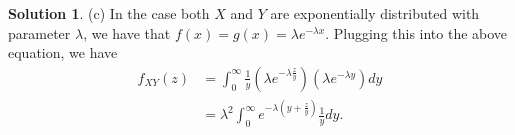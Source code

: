 \documentclass[12pt]{article}
\theoremstyle{definition}
\newtheorem{sol}{Solution}
\theoremstyle{remark}
\begin{document}
\begin{sol}
    (c) In the case both $X$ and $Y$ are exponentially distributed with parameter $\lambda$, we have that $f(x) = g(x) = \lambda e^{-\lambda x}$. Plugging this into the above equation, we have
    \begin{align}
        f_{XY}(z) &= \int_0^\infty \frac{1}{y} \left( \lambda e^{-\lambda \frac{z}{y}} \right)\left( \lambda e^{-\lambda y}\right)dy\\
                  &= \lambda^2 \int_0^\infty e^{-\lambda(y + \frac{z}{y})}\frac{1}{y}dy.
    \end{align}
\end{sol}
\end{document}
